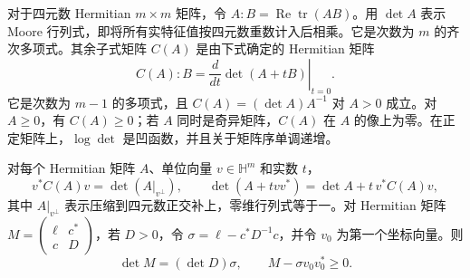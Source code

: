 对于四元数 Hermitian $m\times m$ 矩阵，令 $A:B=\operatorname{Re}\operatorname{tr}(AB)$。用 $\det A$ 表示 Moore 行列式，即将所有实特征值按四元数重数计入后相乘。它是次数为 $m$ 的齐次多项式。其余子式矩阵 $C(A)$ 是由下式确定的 Hermitian 矩阵
\[
C(A):B=\left.\frac{d}{dt}\det(A+tB)\right|_{t=0}.
\]
它是次数为 $m-1$ 的多项式，且 $C(A)=(\det A)A^{-1}$ 对 $A>0$ 成立。对 $A\ge0$，有 $C(A)\ge0$；若 $A$ 同时是奇异矩阵，$C(A)$ 在 $A$ 的像上为零。在正定矩阵上，$\log\det$ 是凹函数，并且关于矩阵序单调递增。

对每个 Hermitian 矩阵 $A$、单位向量 $v\in\mathbb H^m$ 和实数 $t$，
\[
v^*C(A)v=\det(A|_{v^\perp}),\qquad
\det(A+tvv^*)=\det A+t\,v^*C(A)v,
\]
其中 $A|_{v^\perp}$ 表示压缩到四元数正交补上，零维行列式等于一。对 Hermitian 矩阵 $M=\left(\begin{smallmatrix}\ell&c^*\\c&D\end{smallmatrix}\right)$，若 $D>0$，令 $\sigma=\ell-c^*D^{-1}c$，并令 $v_0$ 为第一个坐标向量。则
\[
\det M=(\det D)\sigma,\qquad M-\sigma v_0v_0^*\ge0.
\]
